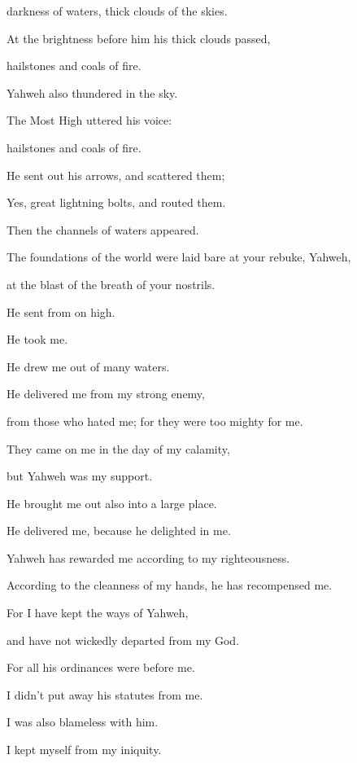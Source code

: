 {\par }{\QB darkness of waters, thick clouds of the skies.
\par }{\Q {}At the brightness before him his thick clouds passed,
\par }{\QB hailstones and coals of fire.
\par }{\Q {}Yahweh also thundered in the sky.
\par }{\QB The Most High uttered his voice:
\par }{\QB hailstones and coals of fire.
\par }{\Q {}He sent out his arrows, and scattered them;
\par }{\QB Yes, great lightning bolts, and routed them.
\par }{\Q {}Then the channels of waters appeared.
\par }{\QB The foundations of the world were laid bare at your rebuke, Yahweh,
\par }{\QB at the blast of the breath of your nostrils.
\par }{\Q {}He sent from on high.
\par }{\QB He took me.
\par }{\QB He drew me out of many waters.
\par }{\Q {}He delivered me from my strong enemy,
\par }{\QB from those who hated me; for they were too mighty for me.
\par }{\Q {}They came on me in the day of my calamity,
\par }{\QB but Yahweh was my support.
\par }{\Q {}He brought me out also into a large place.
\par }{\QB He delivered me, because he delighted in me.
\par }{\Q {}Yahweh has rewarded me according to my righteousness.
\par }{\QB According to the cleanness of my hands, he has recompensed me.
\par }{\Q {}For I have kept the ways of Yahweh,
\par }{\QB and have not wickedly departed from my God.
\par }{\Q {}For all his ordinances were before me.
\par }{\QB I didn’t put away his statutes from me.
\par }{\Q {}I was also blameless with him.
\par }{\QB I kept myself from my iniquity.
}
